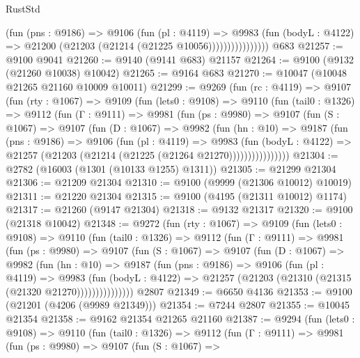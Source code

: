 \begin{lexlean}{RustStd}
\begin{coremodule}
                        (fun (pns : @9186) =>
                        @9106
                          (fun (pl : @4119) =>
                          @9983
                            (fun (bodyL : @4122) =>
                            @21200 (@21203 (@21214 (@21225 @10056))))))))))))))))
    @683
@21257 := @9100 @9041
@21260 := @9140 (@9141 @683) @21157
@21264 := @9100 (@9132 (@21260 @10038) @10042)
@21265 := @9164 @683
@21270 := @10047 (@10048 @21265 @21160 @10009 @10011)
@21299 := @9269
    (fun (rc : @4119) =>
    @9107
      (fun (rty : @1067) =>
      @9109
        (fun (lets0 : @9108) =>
        @9110
          (fun (tail0 : @1326) =>
          @9112
            (fun (Γ : @9111) =>
            @9981
              (fun (ps : @9980) =>
              @9107
                (fun (S : @1067) =>
                @9107
                  (fun (D : @1067) =>
                  @9982
                    (fun (hn : @10) =>
                    @9187
                      (fun (pns : @9186) =>
                      @9106
                        (fun (pl : @4119) =>
                        @9983
                          (fun (bodyL : @4122) =>
                          @21257 (@21203 (@21214 (@21225 (@21264 @21270))))))))))))))))
@21304 := @2782 (@16003 (@1301 (@10133 @1255) @1311))
@21305 := @21299 @21304
@21306 := @21209 @21304
@21310 := @9100 (@9999 (@21306 @10012) @10019)
@21311 := @21220 @21304
@21315 := @9100 (@4195 (@21311 @10012) @1174)
@21317 := @21260 (@9147 @21304)
@21318 := @9132 @21317
@21320 := @9100 (@21318 @10042)
@21348 := @9272
    (fun (rty : @1067) =>
    @9109
      (fun (lets0 : @9108) =>
      @9110
        (fun (tail0 : @1326) =>
        @9112
          (fun (Γ : @9111) =>
          @9981
            (fun (ps : @9980) =>
            @9107
              (fun (S : @1067) =>
              @9107
                (fun (D : @1067) =>
                @9982
                  (fun (hn : @10) =>
                  @9187
                    (fun (pns : @9186) =>
                    @9106
                      (fun (pl : @4119) =>
                      @9983
                        (fun (bodyL : @4122) =>
                        @21257 (@21203 (@21310 (@21315 (@21320 @21270)))))))))))))))
    @2807
@21349 := @6650 @4136
@21353 := @9100 (@21201 (@4206 (@9989 @21349)))
@21354 := @7244 @2807
@21355 := @10045 @21354
@21358 := @9162 @21354 @21265 @21160
@21387 := @9294
    (fun (lets0 : @9108) =>
    @9110
      (fun (tail0 : @1326) =>
      @9112
        (fun (Γ : @9111) =>
        @9981
          (fun (ps : @9980) =>
          @9107
            (fun (S : @1067) =>

\end{coremodule}
\end{lexlean}
